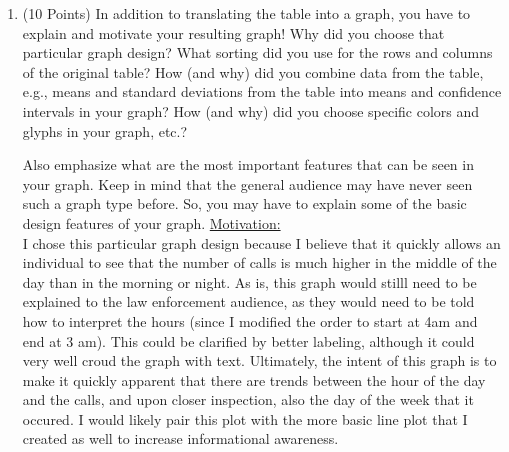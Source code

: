 \documentclass[12pt,letterpaper,final]{article}
\begin{document}
\begin{enumerate}
\begin{enumerate}
\item (10 Points)
In addition to translating the table into a graph, 
you have to explain and motivate your resulting graph!
Why did you choose that particular graph design? What sorting
did you use for the rows and columns of the original table?
How (and why) did you combine data from the table, e.g., means
and standard deviations from the table into means and confidence intervals
in your graph? How (and why) did you choose specific colors
and glyphs in your graph, etc.?

Also emphasize what are the most important features that can be seen
in your graph. Keep in mind that the general audience may have never
seen such a graph type before. So, you may have to explain some
of the basic design features of your graph.
{\scriptsize
\underline{Motivation:}\\
I chose this particular graph design because I believe that it quickly allows an individual to see that the number of calls is much higher in the middle of the day than in the morning or night.  As is, this graph would stilll need to be explained to the law enforcement audience, as they would need to be told how to interpret the hours (since I modified the order to start at 4am and end at 3 am).  This could be clarified by better labeling, although it could very well croud the graph with text.  Ultimately, the intent of this graph is to make it quickly apparent that there are trends between the hour of the day and the calls, and upon closer inspection, also the day of the week that it occured.  I would likely pair this plot with the more basic line plot that I created as well to increase informational awareness.
}

\end{enumerate}

\end{enumerate}


\newpage


~\\
\end{document}
